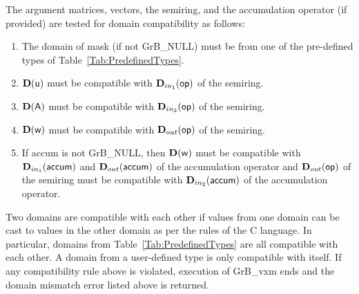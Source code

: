 The argument matrices, vectors, the semiring, and the accumulation operator (if provided) 
are tested for domain compatibility as follows:
\begin{enumerate}
	\item The domain of {\sf mask} (if not {\sf GrB\_NULL}) must be from one of the pre-defined types of Table~\ref{Tab:PredefinedTypes}.

	\item $\bold{D}({\sf u})$ must be compatible with $\mbox{$\mathbf{D}_{in_{1}}$}({\sf op})$ of the semiring.

	\item $\bold{D}({\sf A})$ must be compatible with $\mbox{$\mathbf{D}_{in_{2}}$}({\sf op})$ of the semiring.

	\item $\bold{D}({\sf w})$ must be compatible with $\mbox{$\mathbf{D}_{out}$}({\sf op})$ of the semiring.

	\item If {\sf accum} is not {\sf GrB\_NULL}, then $\bold{D}({\sf w})$ must be compatible with $\mbox{$\mathbf{D}_{in_{1}}$}({\sf accum})$ and $\mbox{$\mathbf{D}_{out}$}({\sf accum})$ of the 
	accumulation operator and $\mbox{$\mathbf{D}_{out}$}({\sf op})$ of the semiring must be compatible with $\mbox{$\mathbf{D}_{in_{2}}$}({\sf accum})$ of the accumulation operator.
\end{enumerate}
Two domains are compatible with each other if values from one domain can be cast 
to values in the other domain as per the rules of the C language.
In particular, domains from Table~\ref{Tab:PredefinedTypes} are all compatible 
with each other. A domain from a user-defined type is only compatible with itself.
If any compatibility rule above is violated, execution of {\sf GrB\_vxm} ends and 
the domain mismatch error listed above is returned.

